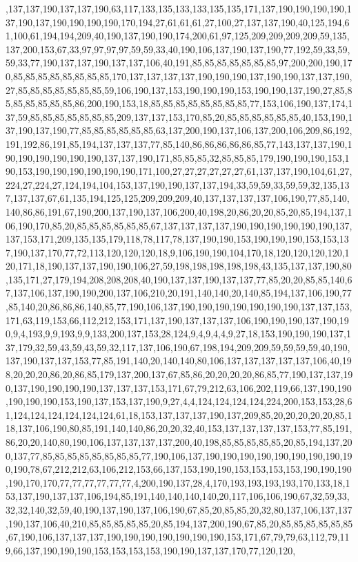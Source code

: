 ,137,137,190,137,137,190,63,117,133,135,133,133,135,135,171,137,190,190,190,190,137,190,137,190,190,190,190,170,194,27,61,61,61,27,100,27,137,137,190,40,125,194,61,100,61,194,194,209,40,190,137,190,190,174,200,61,97,125,209,209,209,209,59,135,137,200,153,67,33,97,97,97,97,59,59,33,40,190,106,137,190,137,190,77,192,59,33,59,59,33,77,190,137,137,190,137,137,106,40,191,85,85,85,85,85,85,85,97,200,200,190,170,85,85,85,85,85,85,85,85,170,137,137,137,137,190,190,190,137,190,190,137,137,190,27,85,85,85,85,85,85,85,59,106,190,137,153,190,190,190,153,190,190,137,190,27,85,85,85,85,85,85,85,86,200,190,153,18,85,85,85,85,85,85,85,85,77,153,106,190,137,174,137,59,85,85,85,85,85,85,85,209,137,137,153,170,85,20,85,85,85,85,85,85,40,153,190,137,190,137,190,77,85,85,85,85,85,85,63,137,200,190,137,106,137,200,106,209,86,192,191,192,86,191,85,194,137,137,137,77,85,140,86,86,86,86,86,85,77,143,137,137,190,190,190,190,190,190,190,137,137,190,171,85,85,85,32,85,85,85,179,190,190,190,153,190,153,190,190,190,190,190,190,171,100,27,27,27,27,27,27,61,137,137,190,104,61,27,224,27,224,27,124,194,104,153,137,190,190,137,137,194,33,59,59,33,59,59,32,135,137,137,137,67,61,135,194,125,125,209,209,209,40,137,137,137,137,106,190,77,85,140,140,86,86,191,67,190,200,137,190,137,106,200,40,198,20,86,20,20,85,20,85,194,137,106,190,170,85,20,85,85,85,85,85,85,67,137,137,137,137,190,190,190,190,190,190,137,137,153,171,209,135,135,179,118,78,117,78,137,190,190,153,190,190,190,153,153,137,190,137,170,77,72,113,120,120,120,18,9,106,190,190,104,170,18,120,120,120,120,120,171,18,190,137,137,190,190,106,27,59,198,198,198,198,198,43,135,137,137,190,80,135,171,27,179,194,208,208,208,40,190,137,137,190,137,137,77,85,20,20,85,85,140,67,137,106,137,190,190,200,137,106,210,20,191,140,140,20,140,85,194,137,106,190,77,85,140,20,86,86,86,140,85,77,190,106,137,190,190,190,190,190,190,190,137,137,153,171,63,119,153,66,112,212,153,171,137,190,137,137,137,106,190,190,190,137,190,190,9,4,193,9,9,193,9,9,133,200,137,153,28,124,9,4,9,4,4,9,27,18,153,190,190,190,137,137,179,32,59,43,59,43,59,32,117,137,106,190,67,198,194,209,209,59,59,59,59,40,190,137,190,137,137,153,77,85,191,140,20,140,140,80,106,137,137,137,137,137,106,40,198,20,20,20,86,20,86,85,179,137,200,137,67,85,86,20,20,20,20,86,85,77,190,137,137,190,137,190,190,190,190,137,137,137,153,171,67,79,212,63,106,202,119,66,137,190,190,190,190,190,153,190,137,153,137,190,9,27,4,4,124,124,124,124,224,200,153,153,28,61,124,124,124,124,124,124,61,18,153,137,137,137,190,137,209,85,20,20,20,20,20,85,118,137,106,190,80,85,191,140,140,86,20,20,32,40,153,137,137,137,137,153,77,85,191,86,20,20,140,80,190,106,137,137,137,137,200,40,198,85,85,85,85,85,20,85,194,137,200,137,77,85,85,85,85,85,85,85,85,77,190,106,137,190,190,190,190,190,190,190,190,190,190,78,67,212,212,63,106,212,153,66,137,153,190,190,153,153,153,153,190,190,190,190,170,170,77,77,77,77,77,77,4,200,190,137,28,4,170,193,193,193,193,170,133,18,153,137,190,137,137,106,194,85,191,140,140,140,140,20,117,106,106,190,67,32,59,33,32,32,140,32,59,40,190,137,190,137,106,190,67,85,20,85,85,20,32,80,137,106,137,137,190,137,106,40,210,85,85,85,85,85,20,85,194,137,200,190,67,85,20,85,85,85,85,85,85,67,190,106,137,137,137,190,190,190,190,190,190,190,153,171,67,79,79,63,112,79,119,66,137,190,190,190,153,153,153,153,190,190,137,137,170,77,120,120,